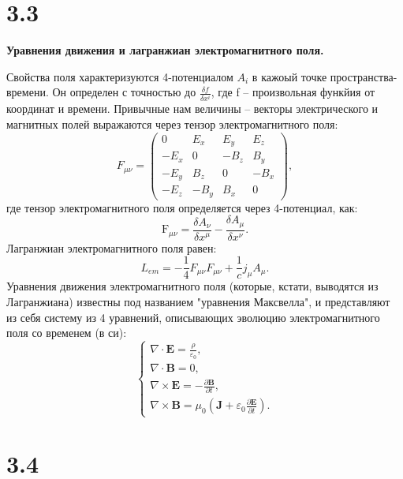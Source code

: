 \documentclass[a4paper,14pt]{article}
\begin{document}
\section*{3.3}
\begin{center}
	\LARGE{\textbf{Уравнения движения и лагранжиан электромагнитного поля.}}
\end{center}

Свойства поля характеризуются 4-потенциалом $A_i$ в кажоый точке пространства-времени. Он определен с точностью до $\frac{\delta f}{\delta x^i}$, где f -- произвольная функйия от координат и времени. Привычные нам величины -- векторы электрического и магнитных полей выражаются через тензор электромагнитного поля:
\begin{equation*}
	F_{\mu \nu} = \begin{pmatrix}
		0 & E_x & E_y & E_z \\
		-E_x & 0 & -B_z & B_y \\
		-E_y & B_z & 0 & -B_x \\
		-E_z & -B_y & B_x & 0
	\end{pmatrix},
\end{equation*}
где тензор электромагнитного поля определяется через 4-потенциал, как:
\begin{equation*}
	\mathrm{F}_{\mu \nu} = \frac{\delta A_\nu}{\delta x^\mu} - \frac{\delta A_\mu}{\delta x^\nu}.
\end{equation*}
Лагранжиан электромагнитного поля равен:
\begin{equation*}
	L_{em} = -\frac{1}{4}F_{\mu \nu}F_{\mu \nu} + \frac{1}{c}j_\mu A_\mu.
\end{equation*}
Уравнения движения электромагнитного поля (которые, кстати, выводятся из Лагранжиана) известны под названием "уравнения Максвелла", и представляют из себя систему из 4 уравнений, описывающих эволюцию электромагнитного поля со временем (в си):
\begin{equation*}
	\begin{cases}
		\nabla \cdot \mathbf{E} = \frac {\rho} {\varepsilon_0},\\
		\nabla \cdot \mathbf{B} = 0,\\
		\nabla \times \mathbf{E} = -\frac{\partial \mathbf{B}} {\partial t},\\
		\nabla \times \mathbf{B} = \mu_0\left(\mathbf{J} + \varepsilon_0 \frac{\partial \mathbf{E}} {\partial t} \right).
	\end{cases}
\end{equation*}

\section*{3.4}
\end{document}
